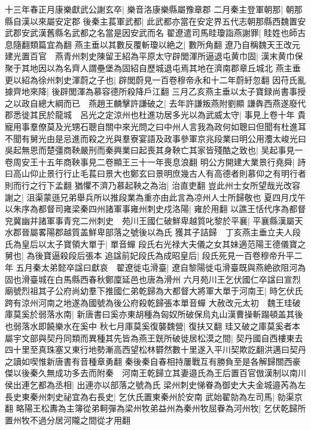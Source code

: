 十三年春正月康樂獻武公謝玄卒|{
	樂音洛康樂縣屬豫章郡}
二月秦主登軍朝那|{
	朝那縣自漢以來屬安定郡}
後秦主萇軍武都|{
	此武都亦當在安定界五代志朝那縣西魏置安武郡安武漢舊縣名武都之名當是因安武而名}
翟遼遣司馬眭瓊詣燕謝罪|{
	眭姓也師古息隨翻類篇宜為翻}
燕主垂以其數反覆斬瓊以絶之|{
	數所角翻}
遼乃自稱魏天王改元建光置百官　燕青州刺史陳留王紹為平原太守辟閭渾所逼退屯黄巾固|{
	漢末黄巾保聚于其地因以為名齊人謂壘堡為固紹自歷城退屯焉其地在濟南郡章丘城北}
燕主垂更以紹為徐州刺史渾蔚之子也|{
	辟閭蔚見一百卷穆帝永和十二年蔚紆忽翻}
因苻氏亂據齊地來降|{
	後辟閭渾為慕容德所殺降戶江翻}
三月乙亥燕主垂以太子寶録尚書事授之以政自總大綱而已　燕趙王麟擊許謙破之|{
	去年許謙叛燕附劉顯}
謙犇西燕遂廢代郡悉徙其民於龍城　呂光之定涼州也杜進功居多光以為武威太守|{
	事見上卷十年}
貴寵用事羣僚莫及光甥石聰自關中來光問之曰中州人言我為政何如聰曰但聞有杜進耳不聞有舅光由是忌進而殺之光與羣寮宴語及政事參軍京兆段業曰明公用灋太峻光曰吳起無恩而楚彊商鞅嚴刑而秦興業曰起喪其身鞅亡其家皆殘酷之致也|{
	吴起事見一卷周安王十五年商鞅事見二卷顯王三十一年喪息浪翻}
明公方開建大業景行堯舜|{
	詩曰高山仰止景行行止毛萇曰景大也鄭玄曰景明庶幾古人有高德者則慕仰之有明行者則而行之行下孟翻}
猶懼不濟乃慕起鞅之為治|{
	治直吏翻}
豈此州士女所望哉光改容謝之|{
	沮渠蒙遜兄弟舉兵所以推段業為重亦由此言為凉州人士所歸敬也}
夏四月戊午以朱序為都督司雍梁秦四州諸軍事雍州刺史戍洛陽|{
	雍於用翻}
以譙王恬代序為都督兖冀幽并諸軍事青兖二州刺史　苑川王國仁破鮮卑越質叱黎於平襄|{
	平襄縣漢屬天水郡晉屬畧陽郡越質盖鮮卑部落之號後以為氏}
獲其子詰歸　丁亥燕主垂立夫人段氏為皇后以太子寶領大單于|{
	單音蟬}
段氏右光禄大夫儀之女其妹適范陽王德儀寶之舅也|{
	為後寶逼殺段后張本}
追諡前妃段氏為成昭皇后|{
	段氏死見一百卷穆帝升平二年}
五月秦太弟懿卒諡曰獻哀　翟遼徙屯滑臺|{
	遼自黎陽徙屯滑臺既與燕絶欲阻河為固也滑臺城在白馬縣西春秋鄭廩延邑也唐為滑州}
六月苑川王乞伏國仁卒諡曰宣烈廟號烈祖其子公府尚幼羣下推國仁弟乾歸為大都督大將軍大單于河南王|{
	時乞伏氏跨有涼州河南之地遂為國號為後公府殺乾歸張本單音蟬}
大赦改元太初　魏王珪破庫莫奚於弱落水南|{
	新唐書曰奚亦東胡種為匈奴所破保烏丸山漢曹操斬蹋頓盖其後也弱落水即饒樂水在奚中}
秋七月庫莫奚復襲魏營|{
	復扶又翻}
珪又破之庫莫奚者本屬宇文部與契丹同類而異種其先皆為燕王皝所破徙居松漠之間|{
	契丹國自西樓東去四十里至真珠塞又東行地勢漸高西望松林欎然數十里遂入平川契欺訖翻洪邁曰契丹之讀如喫惟新唐書有音種章勇翻}
秦後秦自春相持屢戰互有勝負至是各解歸關西豪傑以後秦久無成功多去而附秦　河南王乾歸立其妻邉氏為王后置百官倣漢制以南川侯出連乞都為丞相|{
	出連亦以部落之號為氏}
梁州刺史悌眷為御史大夫金城邉芮為左長史東秦州刺史祕宜為右長史|{
	乞㐲氏置東秦州於安南}
武始翟勍為左司馬|{
	勍渠京翻}
略陽王松夀為主簿從弟軻彈為梁州牧弟益州為秦州牧屈眷為河州牧|{
	乞伏乾歸所置州牧不過分居河隴之間從才用翻}
